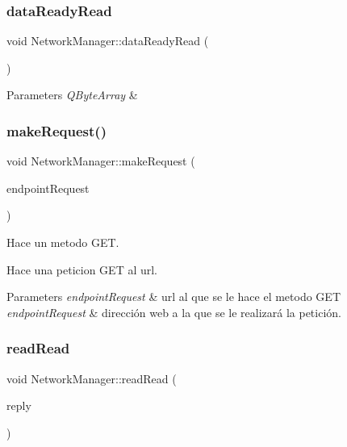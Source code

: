 \subsubsection{\texorpdfstring{data\+Ready\+Read}{dataReadyRead}}
{\footnotesize\ttfamily void Network\+Manager\+::data\+Ready\+Read (\begin{DoxyParamCaption}\item[{Q\+Byte\+Array}]{ }\end{DoxyParamCaption})\hspace{0.3cm}{\ttfamily [signal]}}


\begin{DoxyParams}{Parameters}
{\em Q\+Byte\+Array} & \\
\hline
\end{DoxyParams}
\mbox{\label{classNetworkManager_a4043336eb2e512c9705628fc7b8d0afb}} 
\subsubsection{\texorpdfstring{make\+Request()}{makeRequest()}}
{\footnotesize\ttfamily void Network\+Manager\+::make\+Request (\begin{DoxyParamCaption}\item[{Q\+String}]{endpoint\+Request }\end{DoxyParamCaption})}



Hace un metodo G\+ET. 

Hace una peticion G\+ET al url.


\begin{DoxyParams}{Parameters}
{\em endpoint\+Request} & url al que se le hace el metodo G\+ET\\
\hline
{\em endpoint\+Request} & dirección web a la que se le realizará la petición. \\
\hline
\end{DoxyParams}
\mbox{\label{classNetworkManager_a88e268513ba60096866887dd19838069}} 
\subsubsection{\texorpdfstring{read\+Read}{readRead}}
{\footnotesize\ttfamily void Network\+Manager\+::read\+Read (\begin{DoxyParamCaption}\item[{Q\+Network\+Reply $\ast$}]{reply }\end{DoxyParamCaption})\hspace{0.3cm}{\ttfamily [slot]}}


